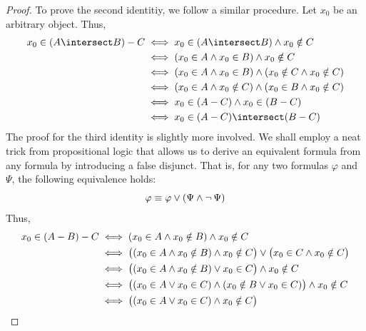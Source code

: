 \begin{proof}
    \vspace{0.5cm}
    \noindent
    To prove the second identitiy, we follow a similar procedure. Let \( x_{0} \) be an arbitrary object. Thus,
    \begin{align*}
        x_{0} \in \mleft( A \intersect B \mright) - C
        &\iff
        x_{0} \in \mleft( A \intersect B \mright) \land x_{0} \notin C\\
        &\iff
        \mleft( x_{0} \in A \land x_{0} \in B \mright) \land x_{0} \notin C\\
        &\iff
        \mleft( x_{0} \in A \land x_{0} \in B \mright)
        \land
        \mleft( x_{0} \notin C \land x_{0} \notin C \mright)\\
        &\iff
        \mleft( x_{0} \in A \land x_{0} \notin C \mright)
        \land
        \mleft( x_{0} \in B \land x_{0} \notin C \mright)\\
        &\iff
        x_{0} \in \mleft( A - C \mright) \land x_{0} \in \mleft( B - C \mright)\\
        &\iff
        x_{0} \in \mleft( A - C \mright) \intersect \mleft( B - C \mright)
    \end{align*}
    The proof for the third identity is slightly more involved.
    We shall employ a neat trick from propositional logic that
    allows us to derive an equivalent formula from any formula by
    introducing a false disjunct. That is, for any two formulas
    \( \varphi \) and \( \Psi \), the following equivalence holds:
    \begin{equation*}
        \varphi \equiv \varphi \lor \mleft( \Psi \land \lnot \, \Psi \mright)
    \end{equation*}
    Thus,
    \begin{align*}
        x_{0} \in \mleft( A - B \mright) - C
        &\iff
        \mleft( x_{0} \in A \land x_{0} \notin B \mright) \land x_{0} \notin C \\
        &\iff
        \big( \mleft( x_{0} \in A \land x_{0} \notin B \mright) \land x_{0} \notin C \big) \lor
        \big( x_{0} \in C \land x_{0} \notin C \big)\\
        &\iff
        \big( \mleft( x_{0} \in A \land x_{0} \notin B \mright) \lor x_{0} \in C \big)
        \land
        x_{0} \notin C \\
        &\iff
        \big( \mleft( x_{0} \in A \lor x_{0} \in C \mright) \land \mleft( x_{0} \notin B \lor x_{0} \in C \mright) \big)
        \land
        x_{0} \notin C\\
        &\iff
        \big( \mleft( x_{0} \in A \lor x_{0} \in C \mright) \land x_{0} \notin C \big)

\end{align*}
\end{proof}

